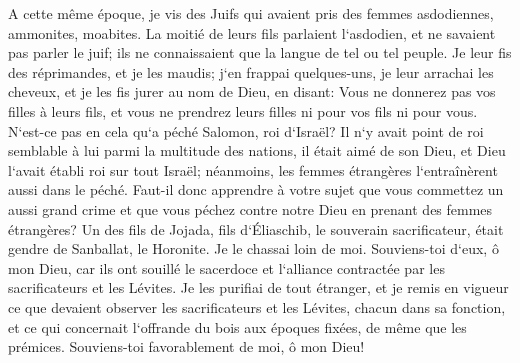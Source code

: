 \verse A cette même époque, je vis des Juifs qui avaient pris des femmes asdodiennes, ammonites, moabites. 
\verse La moitié de leurs fils parlaient l`asdodien, et ne savaient pas parler le juif; ils ne connaissaient que la langue de tel ou tel peuple. 
\verse Je leur fis des réprimandes, et je les maudis; j`en frappai quelques-uns, je leur arrachai les cheveux, et je les fis jurer au nom de Dieu, en disant: Vous ne donnerez pas vos filles à leurs fils, et vous ne prendrez leurs filles ni pour vos fils ni pour vous. 
\verse N`est-ce pas en cela qu`a péché Salomon, roi d`Israël? Il n`y avait point de roi semblable à lui parmi la multitude des nations, il était aimé de son Dieu, et Dieu l`avait établi roi sur tout Israël; néanmoins, les femmes étrangères l`entraînèrent aussi dans le péché. 
\verse Faut-il donc apprendre à votre sujet que vous commettez un aussi grand crime et que vous péchez contre notre Dieu en prenant des femmes étrangères? 
\verse Un des fils de Jojada, fils d`Éliaschib, le souverain sacrificateur, était gendre de Sanballat, le Horonite. Je le chassai loin de moi. 
\verse Souviens-toi d`eux, ô mon Dieu, car ils ont souillé le sacerdoce et l`alliance contractée par les sacrificateurs et les Lévites. 
\verse Je les purifiai de tout étranger, et je remis en vigueur ce que devaient observer les sacrificateurs et les Lévites, chacun dans sa fonction, 
\verse et ce qui concernait l`offrande du bois aux époques fixées, de même que les prémices. Souviens-toi favorablement de moi, ô mon Dieu! 
